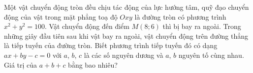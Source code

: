 \begin{ex}%
	Một vật chuyển động tròn đều chịu tác động của lực hướng tâm, quỹ đạo chuyển động của vật trong mặt phẳng toạ độ $Oxy$ là đường tròn có phương trình $x^2+y^2=100$. Vật chuyển động đến điểm $M(8;6)$ thì bị bay ra ngoài. Trong những giây đầu tiên sau khi vật bay ra ngoài, vật chuyển động trên đường thẳng là tiếp tuyến của đường tròn. Biết phương trình tiếp tuyến đó có dạng $ ax + b y - c = 0$ với $a$, $b$, $c$ là các số nguyên dương và $a$, $b$ nguyên tố cùng nhau. Giá trị của $a + b + c $ bằng bao nhiêu?
\end{ex}
